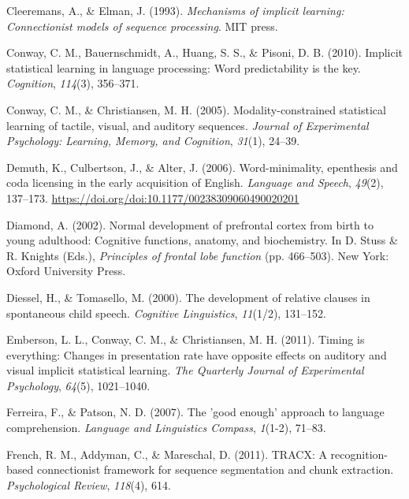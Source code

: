 \documentclass[
  english,
  man,mask,floatsintext]{apa6}
\begin{document}
\leavevmode\hypertarget{ref-cleeremans1993mechanisms}{}%
Cleeremans, A., \& Elman, J. (1993). \emph{Mechanisms of implicit learning: Connectionist models of sequence processing}. MIT press.

\leavevmode\hypertarget{ref-conway2010implicit}{}%
Conway, C. M., Bauernschmidt, A., Huang, S. S., \& Pisoni, D. B. (2010). Implicit statistical learning in language processing: Word predictability is the key. \emph{Cognition}, \emph{114}(3), 356--371.

\leavevmode\hypertarget{ref-conway2005modality}{}%
Conway, C. M., \& Christiansen, M. H. (2005). Modality-constrained statistical learning of tactile, visual, and auditory sequences. \emph{Journal of Experimental Psychology: Learning, Memory, and Cognition}, \emph{31}(1), 24--39.

\leavevmode\hypertarget{ref-demuth2006word}{}%
Demuth, K., Culbertson, J., \& Alter, J. (2006). Word-minimality, epenthesis and coda licensing in the early acquisition of English. \emph{Language and Speech}, \emph{49}(2), 137--173. \url{https://doi.org/doi:10.1177/00238309060490020201}

\leavevmode\hypertarget{ref-diamond2002normal}{}%
Diamond, A. (2002). Normal development of prefrontal cortex from birth to young adulthood: Cognitive functions, anatomy, and biochemistry. In D. Stuss \& R. Knights (Eds.), \emph{Principles of frontal lobe function} (pp. 466--503). New York: Oxford University Press.

\leavevmode\hypertarget{ref-diessel2000development}{}%
Diessel, H., \& Tomasello, M. (2000). The development of relative clauses in spontaneous child speech. \emph{Cognitive Linguistics}, \emph{11}(1/2), 131--152.

\leavevmode\hypertarget{ref-emberson2011timing}{}%
Emberson, L. L., Conway, C. M., \& Christiansen, M. H. (2011). Timing is everything: Changes in presentation rate have opposite effects on auditory and visual implicit statistical learning. \emph{The Quarterly Journal of Experimental Psychology}, \emph{64}(5), 1021--1040.

\leavevmode\hypertarget{ref-ferreira2007good}{}%
Ferreira, F., \& Patson, N. D. (2007). The 'good enough' approach to language comprehension. \emph{Language and Linguistics Compass}, \emph{1}(1-2), 71--83.

\leavevmode\hypertarget{ref-french2011tracx}{}%
French, R. M., Addyman, C., \& Mareschal, D. (2011). TRACX: A recognition-based connectionist framework for sequence segmentation and chunk extraction. \emph{Psychological Review}, \emph{118}(4), 614.
\end{document}

